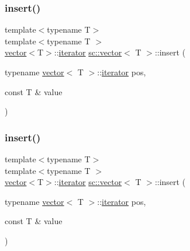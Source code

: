 \subsubsection{\texorpdfstring{insert()}{insert()}\hspace{0.1cm}{\footnotesize\ttfamily [3/9]}}
{\footnotesize\ttfamily template$<$typename T$>$ \\
template$<$typename T $>$ \\
\mbox{\hyperlink{classsc_1_1vector}{vector}}$<$T$>$\+::\mbox{\hyperlink{classsc_1_1vector_1_1iterator}{iterator}} \mbox{\hyperlink{classsc_1_1vector}{sc\+::vector}}$<$ T $>$\+::insert (\begin{DoxyParamCaption}\item[{typename \mbox{\hyperlink{classsc_1_1vector}{vector}}$<$ T $>$\+::\mbox{\hyperlink{classsc_1_1vector_1_1iterator}{iterator}}}]{pos,  }\item[{const T \&}]{value }\end{DoxyParamCaption})}

\mbox{\label{classsc_1_1vector_a1aaf0a1fcdac2a58a96a2a00105b2e1f}} 
\subsubsection{\texorpdfstring{insert()}{insert()}\hspace{0.1cm}{\footnotesize\ttfamily [4/9]}}
{\footnotesize\ttfamily template$<$typename T$>$ \\
template$<$typename T $>$ \\
\mbox{\hyperlink{classsc_1_1vector}{vector}}$<$T$>$\+::\mbox{\hyperlink{classsc_1_1vector_1_1iterator}{iterator}} \mbox{\hyperlink{classsc_1_1vector}{sc\+::vector}}$<$ T $>$\+::insert (\begin{DoxyParamCaption}\item[{typename \mbox{\hyperlink{classsc_1_1vector}{vector}}$<$ T $>$\+::\mbox{\hyperlink{classsc_1_1vector_1_1iterator}{iterator}}}]{pos,  }\item[{const T \&}]{value }\end{DoxyParamCaption})}

\mbox{\label{classsc_1_1vector_a012eb735dde72dfb787dca4acea6c642}} 
